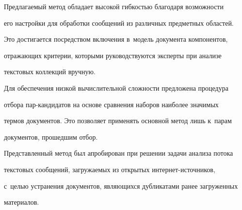   Предлагаемый метод обладает высокой гибкостью благодаря возможности

его настройки для обработки сообщений из различных предметных областей.

Это достигается посредством включения в~модель документа компонентов,

отражающих критерии, которыми руководствуются эксперты при анализе

текстовых коллекций вручную.



  Для обеспечения низкой вычислительной сложности предложена процедура

отбора пар-кан\-ди\-да\-тов на основе сравнения наборов наиболее значимых

термов документов. Это позволяет применять основной метод лишь к~парам

документов, прошедшим отбор.



  Представленный метод был апробирован при решении задачи анализа потока

текстовых сообщений, загружаемых из открытых ин\-тер\-нет-ис\-точ\-ни\-ков,

с~целью устранения документов, являющихся дубликатами ранее загруженных

материалов.



